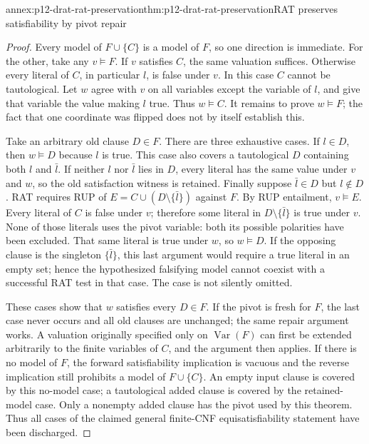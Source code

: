 \begin{annexitem}{annex:p12-drat-rat-preservation}{thm:p12-drat-rat-preservation}{RAT preserves satisfiability by pivot repair}
\begin{proof}
Every model of \(F\cup\{C\}\) is a model of \(F\), so one direction
is immediate.  For the other, take any \(v\models F\).  If \(v\)
satisfies \(C\), the same valuation suffices.  Otherwise every literal of
\(C\), in particular \(l\), is false under \(v\).  In this case \(C\)
cannot be tautological.  Let \(w\) agree with \(v\) on all variables
except the variable of \(l\), and give that variable the value making
\(l\) true.  Thus \(w\models C\).  It remains to prove
\(w\models F\); the fact that one coordinate was flipped does not by
itself establish this.

Take an arbitrary old clause \(D\in F\).  There are three exhaustive
cases.  If \(l\in D\), then \(w\models D\) because \(l\) is true.
This case also covers a tautological \(D\) containing both \(l\) and
\(\bar l\).  If neither \(l\) nor \(\bar l\) lies in \(D\), every
literal has the same value under \(v\) and \(w\), so the old satisfaction
witness is retained.  Finally suppose \(\bar l\in D\) but \(l\notin D\).
RAT requires RUP of
\(E=C\cup(D\setminus\{\bar l\})\) against \(F\).  By RUP
entailment, \(v\models E\).  Every literal of \(C\) is false under
\(v\); therefore some literal in \(D\setminus\{\bar l\}\) is true
under \(v\).  None of those literals uses the pivot variable: both its
possible polarities have been excluded.  That same literal is true under
\(w\), so \(w\models D\).  If the opposing clause is the singleton
\(\{\bar l\}\), this last argument would require a true literal in an
empty set; hence the hypothesized falsifying model cannot coexist with a
successful RAT test in that case.  The case is not silently omitted.

These cases show that \(w\) satisfies every \(D\in F\).  If the pivot
is fresh for \(F\), the last case never occurs and all old clauses are
unchanged; the same repair argument works.  A valuation originally specified
only on \(\operatorname{Var}(F)\) can first be extended arbitrarily to
the finite variables of \(C\), and the argument then applies.  If there is
no model of \(F\), the forward satisfiability implication is vacuous and
the reverse implication still prohibits a model of \(F\cup\{C\}\).
An empty input clause is covered by this no-model case; a tautological added
clause is covered by the retained-model case.  Only a nonempty added clause
has the pivot used by this theorem.  Thus all cases of the claimed general
finite-CNF equisatisfiability statement have been discharged.
\end{proof}
\end{annexitem}

